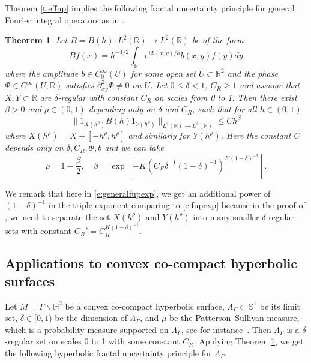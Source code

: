 \documentclass[reqno,12pt,letterpaper]{amsart}
\newtheorem{thm}[prop]{Theorem}
\numberwithin{equation}{section}
\numberwithin{prop}{section}
\begin{document}

Theorem \ref{t:effup} implies the following fractal uncertainty principle
for general Fourier integral operators as in \cite[\S 4.2]{fullgap}. 

\begin{thm}
\label{t:generalfup}
Let $B=B(h):L^2(\mathbb{R})\to L^2(\mathbb{R})$ be of the form
\begin{equation*}
Bf(x)=h^{-1/2}\int_{\mathbb{R}}e^{i\Phi(x,y)/h}b(x,y)f(y)dy
\end{equation*}
where the amplitude $b\in C_0^\infty(U)$ for some open set $U\subset\mathbb{R}^2$ and the phase $\Phi\in C^\infty(U;\mathbb{R})$ satisfies $\partial_{xy}^2\Phi\neq0$ on $U$. Let $0\leq\delta<1$, $C_R\geq1$ and assume that $X,Y\subset\mathbb{R}$ are $\delta$-regular with constant $C_R$ on scales from 0 to 1. Then there exist $\beta>0$ and $\rho\in(0,1)$ depending only on $\delta$ and $C_R$, such that for all $h\in(0,1)$
\begin{equation}
\label{e:generalfup}
\|1_{X(h^\rho)}B(h)1_{Y(h^\rho)}\|_{L^2(\mathbb{R})\to L^2(\mathbb{R})}\leq Ch^\beta
\end{equation}
where $X(h^\rho)=X+[-h^\rho,h^\rho]$ and similarly for $Y(h^\rho)$. Here the constant $C$ depends only on $\delta, C_R,\Phi,b$ and we can take 
\begin{equation}
\label{e:generalfupexp}
\rho=1-\frac{\beta}{2},
\quad\beta=\exp\left[-K(C_R\delta^{-1}(1-\delta)^{-1})^{K(1-\delta)^{-3}}\right].
\end{equation} 
\end{thm}

We remark that here in \eqref{e:generalfupexp}, we get an additional power of $(1-\delta)^{-1}$ in the triple exponent comparing to \eqref{e:fupexp} because in the proof of \cite[\S 4]{fullgap}, we need to separate the set $X(h^\rho)$ and $Y(h^\rho)$ into many smaller $\delta$-regular sets with constant $C_R'=C_R^{K(1-\delta)^{-1}}$. 


\subsection{Applications to convex co-compact hyperbolic surfaces}
\label{s:hyper}

Let $M=\Gamma\backslash\mathbb H^2$ be a convex co-compact hyperbolic surface,
$\Lambda_\Gamma\subset\mathbb S^1$ be its limit set, $\delta\in [0,1)$ be the dimension
of $\Lambda_\Gamma$, and $\mu$ be the Patterson--Sullivan measure, which is a
probability measure supported on $\Lambda_\Gamma$, see for instance~\cite[\S14.1]{BorthwickBook}. Then $\Lambda_\Gamma$ is a $\delta$-regular set on scales 0 to 1 with some constant $C_R$. Applying Theorem \ref{t:generalfup}, we get the following hyperbolic fractal uncertainty principle for $\Lambda_\Gamma.$
\end{document}

